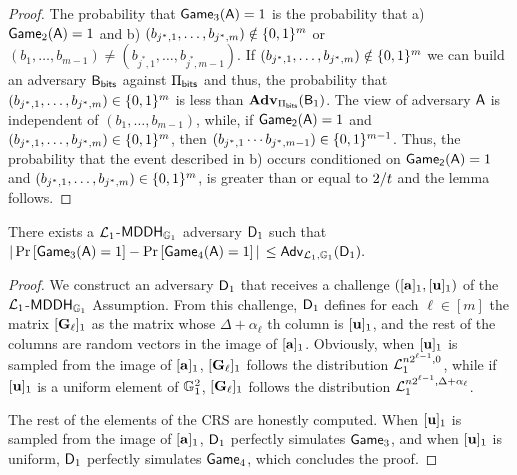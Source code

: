 \begin{proof}  The probability that
 \(\mathsf{Game}_3(\mathsf{A})=1\) is the probability that  a) \(\mathsf{Game}_2(\mathsf{A})=1\) and
b) \((b_{j^*,1},\ldots,b_{j^*,m})\notin\{0,1\}^m\) or \((b_1,\ldots, b_{m-1}) \neq (b_{j^*,1},\ldots, b_{j^*,m-1})\). If \((b_{j^*,1},\ldots,\allowbreak b_{j^*,m})\notin\{0,1\}^m\) we can build an adversary \(\mathsf{B}_{\mathsf{bits}}\) against \(\Pi_{\mathsf{bits}}\) and thus, the probability that \((b_{j^*,1},\ldots,b_{j^*,m})\in\{0,1\}^m\) is less than \(\mathbf{Adv}_{\Pi_{\mathsf{bits}}}(\mathsf{B}_1)\). The view of adversary \(\mathsf{A}\) is independent of \((b_{1},\ldots, b_{m-1})\), while, if \(\mathsf{Game_2}(\mathsf{A})=1\) and \((b_{j^*,1},\ldots,b_{j^*,m})\in\{0,1\}^{m}\), then \((b_{j^*,1}\cdots b_{j^*,m-1})\in\{0,1\}^{m-1}\). Thus, 
the probability that the event described in b) occurs conditioned on \(\mathsf{Game_2}(\mathsf{A})=1\) and \((b_{j^*,1},\ldots,b_{j^*,m})\in\{0,1\}^{m}\), is greater than or equal to \(2/t \) and the lemma follows.
\end{proof}

\begin{lemma} There exists a \(\mathcal{L}_1\)-\(\mathsf{MDDH}_{\mathbb{G}_1}\) adversary \(\mathsf{D}_1\) such that
\(|\Pr\left[\mathsf{Game}_{3}(\mathsf{A})=1\right]\allowbreak-\Pr\left[\mathsf{Game}_{4}(\mathsf{A})=1\right]|\) $\leq
    \mathsf{Adv}_{\mathcal{L}_1,\mathbb{G}_1}(\mathsf{D}_1).$
\label{lemma:bits2}
\end{lemma}

\begin{proof}
We construct an adversary \(\mathsf{D}_1\) that receives 
a challenge \(([\mathbf{a}]_1,[\mathbf{u}]_1)\) of the 
\(\mathcal{L}_1\)-\(\mathsf{MDDH}_{\mathbb{G}_1}\) Assumption. From this challenge, \(\mathsf{D}_1\) defines for each \(\ell\in [m]\) the matrix  \([\mathbf{{G}}_\ell]_1\) as the matrix whose  \(\Delta+\alpha_\ell\) th column is \([\mathbf{u}]_1\), and the rest of the columns are random vectors in the image of \([\mathbf{a}]_1\). 
Obviously, when \([\mathbf{u}]_1\) is sampled from 
the image of \([\mathbf{a}]_1\), \([\mathbf{{G}}_\ell]_1\) follows the distribution \(\mathcal{L}_1^{n2^{\ell-1},0}\), while if \([\mathbf{u}]_1\) is a uniform element of \(\mathbb{G}^2_1\), \([\mathbf{{G}}_\ell]_1\) follows the distribution \(\mathcal{L}_1^{n2^{\ell-1},\Delta+\alpha_\ell}\). 
 
The rest of the elements of the CRS are honestly computed. When \([\mathbf{u}]_1\) is sampled from the image of \([\mathbf{{a}}]_1\), \(\mathsf{D}_1\) perfectly simulates \(\mathsf{Game}_3\), and when \([\mathbf{u}]_1\) is uniform, \(\mathsf{D}_1\) perfectly simulates \(\mathsf{Game}_4\), which concludes the proof. 
\end{proof}


